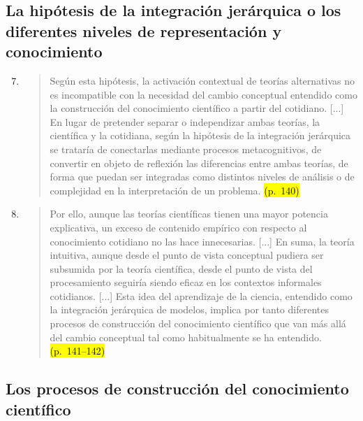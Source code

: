 \documentclass{article}
\begin{document}
\subsection*{La hipótesis de la integración jerárquica o los diferentes niveles de representación y conocimiento}

\begin{enumerate}
  \setcounter{enumi}{6}

  \item
  \begin{quote}
  Según esta hipótesis, la activación contextual de teorías alternativas no es incompatible con la necesidad del cambio conceptual entendido como la construcción del conocimiento científico a partir del cotidiano. [...] En lugar de pretender separar o independizar ambas teorías, la científica y la cotidiana, según la hipótesis de la integración jerárquica se trataría de conectarlas mediante procesos metacognitivos, de convertir en objeto de reflexión las diferencias entre ambas teorías, de forma que puedan ser integradas como distintos niveles de análisis o de complejidad en la interpretación de un problema. \hl{(p.~140)}
  \end{quote}

  \item
  \begin{quote}
  Por ello, aunque las teorías científicas tienen una mayor potencia explicativa, un exceso de contenido empírico con respecto al conocimiento cotidiano no las hace innecesarias. [...] En suma, la teoría intuitiva, aunque desde el punto de vista conceptual pudiera ser subsumida por la teoría científica, desde el punto de vista del procesamiento seguiría siendo eficaz en los contextos informales cotidianos. [...] Esta idea del aprendizaje de la ciencia, entendido como la integración jerárquica de modelos, implica por tanto diferentes procesos de construcción del conocimiento científico que van más allá del cambio conceptual tal como habitualmente se ha entendido. \hl{(p.~141–142)}
  \end{quote}
\end{enumerate}


\subsection*{Los procesos de construcción del conocimiento científico}
\end{document}
